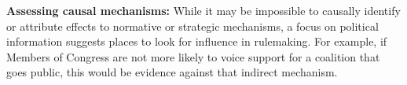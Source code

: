 







\textbf{Assessing causal mechanisms:}
While it may be impossible to causally identify or attribute effects to normative or strategic mechanisms, 
a focus on political information 
suggests places to look for influence in rulemaking. For example, if Members of Congress are not more likely to voice support for a coalition that goes public, this would be evidence against that indirect mechanism.
